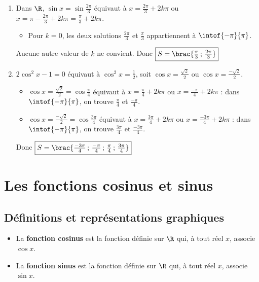 \begin{methode}
\begin{correction}
\begin{enumerate}
			      Donc $\boxed{S = \brac{\tfrac{-5\pi}{6}\,;\,\tfrac{-\pi}{6}}}$

			\item Dans $\R$, $\sin x = \sin\frac{2\pi}{3}$ équivaut à $x = \frac{2\pi}{3} + 2k\pi$ ou $x = \pi - \frac{2\pi}{3} + 2k\pi = \frac{\pi}{3} + 2k\pi$.

			      \begin{itemize}
				      \item Pour $k = 0$, les deux solutions $\frac{2\pi}{3}$ et $\frac{\pi}{3}$ appartiennent à $\intof{-\pi}{\pi}$.
			      \end{itemize}

			      Aucune autre valeur de $k$ ne convient. Donc $\boxed{S = \brac{\tfrac{\pi}{3}\,;\,\tfrac{2\pi}{3}}}$

			\item $2\cos^2 x - 1 = 0$ équivaut à $\cos^2 x = \frac{1}{2}$, soit $\cos x = \frac{\sqrt{2}}{2}$ ou $\cos x = \frac{-\sqrt{2}}{2}$.

			      \begin{itemize}
				      \item $\cos x = \frac{\sqrt{2}}{2} = \cos\frac{\pi}{4}$ équivaut à $x = \frac{\pi}{4} + 2k\pi$ ou $x = \frac{-\pi}{4} + 2k\pi$ : dans $\intof{-\pi}{\pi}$, on trouve $\frac{\pi}{4}$ et $\frac{-\pi}{4}$.
				      \item $\cos x = \frac{-\sqrt{2}}{2} = \cos\frac{3\pi}{4}$ équivaut à $x = \frac{3\pi}{4} + 2k\pi$ ou $x = \frac{-3\pi}{4} + 2k\pi$ : dans $\intof{-\pi}{\pi}$, on trouve $\frac{3\pi}{4}$ et $\frac{-3\pi}{4}$.
			      \end{itemize}

			      Donc $\boxed{S = \brac{\tfrac{-3\pi}{4}\,;\,\tfrac{-\pi}{4}\,;\,\tfrac{\pi}{4}\,;\,\tfrac{3\pi}{4}}}$
		\end{enumerate}
	\end{correction}
\end{methode}

\section{Les fonctions cosinus et sinus}

\subsection{Définitions et représentations graphiques}

\begin{defin}
	\nline
	\begin{itemize}
		\item La \textbf{fonction cosinus} est la fonction définie sur $\R$ qui, à tout réel $x$, associe $\cos x$.
		\item La \textbf{fonction sinus} est la fonction définie sur $\R$ qui, à tout réel $x$, associe $\sin x$.
	\end{itemize}
\end{defin}

